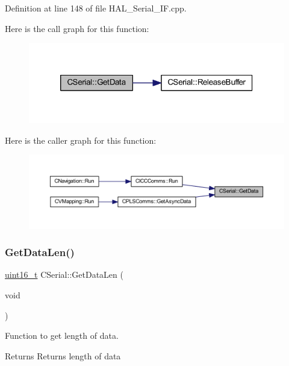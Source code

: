 Definition at line 148 of file H\+A\+L\+\_\+\+Serial\+\_\+\+I\+F.\+cpp.

Here is the call graph for this function\+:\nopagebreak
\begin{figure}[H]
\begin{center}
\leavevmode
\includegraphics[width=320pt]{class_c_serial_abad86c07f530569b2ceeea75bda485ad_cgraph}
\end{center}
\end{figure}
Here is the caller graph for this function\+:\nopagebreak
\begin{figure}[H]
\begin{center}
\leavevmode
\includegraphics[width=350pt]{class_c_serial_abad86c07f530569b2ceeea75bda485ad_icgraph}
\end{center}
\end{figure}
\mbox{\label{class_c_serial_a4327d6041fe9a390612b214709027cbb}} 
\subsubsection{\texorpdfstring{GetDataLen()}{GetDataLen()}}
{\footnotesize\ttfamily \mbox{\hyperlink{_a_d_a_s___types_8h_a1f1825b69244eb3ad2c7165ddc99c956}{uint16\+\_\+t}} C\+Serial\+::\+Get\+Data\+Len (\begin{DoxyParamCaption}\item[{void}]{ }\end{DoxyParamCaption})}



Function to get length of data. 

\begin{DoxyReturn}{Returns}
Returns length of data 
\end{DoxyReturn}


